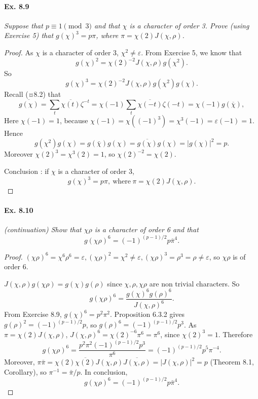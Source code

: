 \documentclass[11pt,a4paper]{article}
\begin{document}
{\paragraph{Ex. 8.9}

{\it Suppose that $p\equiv 1 \pmod 3$ and that $\chi$ is a character of order 3. Prove (using Exercise 5) that $g(\chi)^3 = p\pi$, where $\pi = \chi(2)J(\chi,\rho)$.
}

\begin{proof}
As $\chi$ is a character of order 3, $\chi^2\neq \varepsilon$. From Exercise 5, we know that
$$g(\chi)^2 = \chi(2)^{-2} J(\chi,\rho) g(\chi^2).$$
So
$$g(\chi)^3 = \chi(2)^{-2} J(\chi,\rho) g(\chi^2)g(\chi).$$
Recall  (¤8.2) that
$$\overline{g(\chi)} = \sum_t \overline{\chi(t)} \zeta^{-t} = \chi(-1) \sum_t \overline{\chi(-t)} \zeta(-t) = \chi(-1) g(\overline{\chi}),$$
Here $\chi(-1) = 1$, because $\chi(-1) = \chi((-1)^3) = \chi^3(-1) = \varepsilon(-1) = 1$.
Hence
$$g(\chi^2) g(\chi) = g(\bar{\chi}) g(\chi) =\overline{g(\chi)} g(\chi) = \vert g(\chi) \vert^2 =p.$$
Moreover $\chi(2)^3 = \chi^3(2) = 1$, so $\chi(2)^{-2} = \chi(2)$.

\medskip

Conclusion : if $\chi$ is a character of order 3,
 $$g(\chi)^3 = p \pi, \ \mathrm{where}\ \pi = \chi(2) J(\chi,\rho).$$
\end{proof}

\paragraph{Ex. 8.10}

{\it (continuation) Show that $\chi \rho$ is a character of order 6 and that $$g(\chi \rho)^6 = (-1)^{(p-1)/2} p \overline{\pi}^4.$$
}

\begin{proof}
$(\chi \rho)^6 = \chi^6 \rho^6 = \varepsilon, (\chi \rho)^2 = \chi^2 \neq \varepsilon, (\chi \rho)^3 = \rho^3 = \rho \neq \varepsilon$, so  $\chi \rho$ is of order 6.

$J(\chi,\rho) g(\chi \rho) = g(\chi) g(\rho)$ since $\chi, \rho, \chi \rho$ are non trivial characters. So
$$g(\chi \rho)^6 = \frac{g(\chi)^6 g(\rho)^6}{J(\chi, \rho)^6}.$$
From Exercise 8.9, $g(\chi)^6 = p^2 \pi^2$. Proposition 6.3.2 gives $g(\rho)^2 = (-1)^{(p-1)/2} p$, so $g(\rho)^6 =  (-1)^{(p-1)/2} p^3$. 
As $\pi = \chi(2) J(\chi,\rho)$,  $J(\chi,\rho)^6 = \chi(2)^{-6} \pi^6 = \pi^6$, since $\chi(2)^3=1$. Therefore
 $$g(\chi \rho)^6 = \frac{p^2 \pi^2 (-1)^{(p-1)/2} p^3}{\pi^6} = (-1)^{(p-1)/2} p^5 \pi^{-4}.$$
 Moreover, $\pi \bar{\pi} = \chi(2) \overline{\chi(2)} J(\chi,\rho) \overline {J(\chi,\rho)} = \vert J(\chi,\rho) \vert^2 =p$ (Theorem 8.1, Corollary), so $ \pi^{-1} = \bar{\pi}/p$. In conclusion,
$$g(\chi \rho)^6 = (-1)^{(p-1)/2} p \bar{\pi}^4.$$
\end{proof}

}
\end{document}

